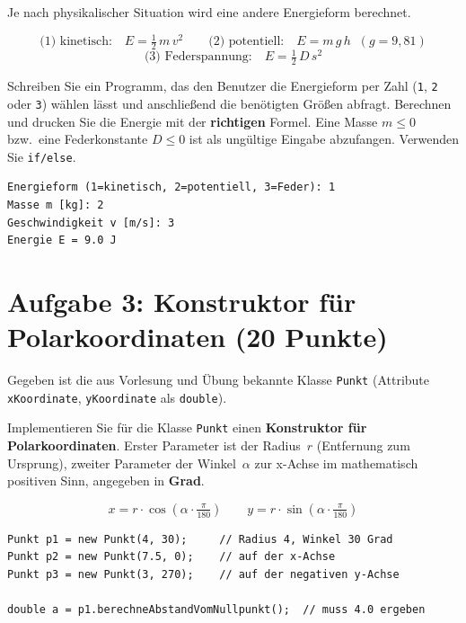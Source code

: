 \documentclass[
	fontsize=12pt,
	paper=a4,
	numbers=noenddot,
	parskip=half,
	openany
]{scrbook}
\begin{document}
Je nach physikalischer Situation wird eine andere Energieform berechnet.

\begin{formeln}
\[
	\text{(1) kinetisch:}\quad E = \tfrac{1}{2}\,m\,v^2
	\qquad
	\text{(2) potentiell:}\quad E = m\,g\,h \;\;(g = 9{,}81)
\]
\[
	\text{(3) Federspannung:}\quad E = \tfrac{1}{2}\,D\,s^2
\]
\end{formeln}

Schreiben Sie ein Programm, das den Benutzer die Energieform per Zahl (\texttt{1}, \texttt{2} oder \texttt{3}) wählen lässt und anschließend die benötigten Größen abfragt. Berechnen und drucken Sie die Energie mit der \textbf{richtigen} Formel. Eine Masse $m \le 0$ bzw.\ eine Federkonstante $D \le 0$ ist als ungültige Eingabe abzufangen. Verwenden Sie \texttt{if/else}.

\begin{beispiel}[Beispieldialog]
\begin{lstlisting}[language={}]
Energieform (1=kinetisch, 2=potentiell, 3=Feder): 1
Masse m [kg]: 2
Geschwindigkeit v [m/s]: 3
Energie E = 9.0 J
\end{lstlisting}
\end{beispiel}

\clearpage
\section*{Aufgabe 3: Konstruktor für Polarkoordinaten \hfill (20 Punkte)}

Gegeben ist die aus Vorlesung und Übung bekannte Klasse \texttt{Punkt} (Attribute \texttt{xKoordinate}, \texttt{yKoordinate} als \texttt{double}).

Implementieren Sie für die Klasse \texttt{Punkt} einen \textbf{Konstruktor für Polarkoordinaten}. Erster Parameter ist der Radius~$r$ (Entfernung zum Ursprung), zweiter Parameter der Winkel~$\alpha$ zur x-Achse im mathematisch positiven Sinn, angegeben in \textbf{Grad}.

\begin{formeln}
\[
	x = r \cdot \cos\!\left(\alpha \cdot \tfrac{\pi}{180}\right)
	\qquad
	y = r \cdot \sin\!\left(\alpha \cdot \tfrac{\pi}{180}\right)
\]
\end{formeln}

\begin{lstlisting}
Punkt p1 = new Punkt(4, 30);     // Radius 4, Winkel 30 Grad
Punkt p2 = new Punkt(7.5, 0);    // auf der x-Achse
Punkt p3 = new Punkt(3, 270);    // auf der negativen y-Achse

double a = p1.berechneAbstandVomNullpunkt();  // muss 4.0 ergeben
\end{lstlisting}
\end{document}
